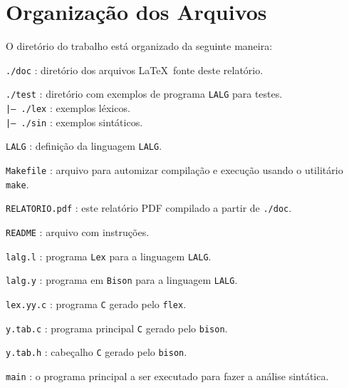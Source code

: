\section{Organização dos Arquivos \label{sec:organizacao-dos-arquivos}}

O diretório do trabalho está organizado da seguinte maneira:

\indent\indent\texttt{./doc} : diretório dos arquivos \LaTeX~fonte deste relatório.

\indent\indent\texttt{./test} : diretório com exemplos de programa \texttt{LALG} para testes.\\
\indent\indent\indent\texttt{|-- ./lex} : exemplos léxicos.\\
\indent\indent\indent\texttt{|-- ./sin} : exemplos sintáticos.

\indent\indent\texttt{\texttt{LALG}} : definição da linguagem \texttt{LALG}.

\indent\indent\texttt{Makefile} : arquivo para automizar compilação e execução usando o utilitário \texttt{make}.

\indent\indent\texttt{RELATORIO.pdf} : este relatório PDF compilado a partir de \texttt{./doc}.

\indent\indent\texttt{README} : arquivo com instruções.

\indent\indent\texttt{lalg.l} : programa \texttt{Lex} para a linguagem \texttt{LALG}.

\indent\indent\texttt{lalg.y} : programa em \texttt{Bison} para a linguagem \texttt{LALG}.

\indent\indent\texttt{lex.yy.c} : programa \texttt{C} gerado pelo \texttt{flex}.

\indent\indent\texttt{y.tab.c} : programa principal \texttt{C} gerado pelo \texttt{bison}.

\indent\indent\texttt{y.tab.h} : cabeçalho \texttt{C} gerado pelo \texttt{bison}.

\indent\indent\texttt{main} : o programa principal a ser executado para fazer a análise sintática.